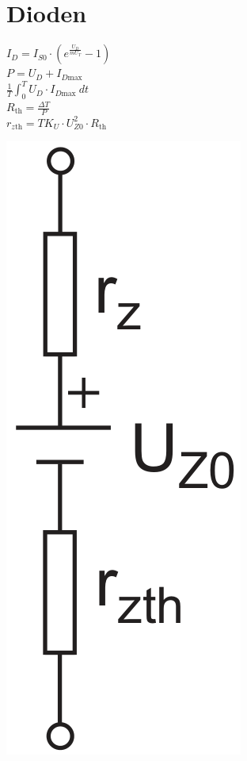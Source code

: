 \documentclass[a5paper, 12pt, twoside]{scrartcl}
\begin{document}
\section{Dioden}

\begin{minipage}{.69\linewidth}
  \dotfill\(I_D = I_{S0} \cdot \left( e^{\frac{U_D}{mU_T}}-1 \right)\)\\[1em]
  \dotfill\(P = U_D + I_{D\text{max}}\)\\[1em]
  \dotfill\(\frac{1}{T} \int_0^T U_D \cdot I_{D\text{max}}\ dt\)\\[1em]
  \dotfill\(R_{\text{th}} = \frac{\Delta T}{P}\)\\[1em]
  \dotfill\(r_{z\text{th}} = TK_U \cdot U^2_{Z0} \cdot R_{\text{th}}\)
\end{minipage}\hfill%
\begin{minipage}{.29\linewidth}
  {\centering
    \includegraphics[width=.4\textwidth]{ESB_ZDiode}
    \par
  }
\end{minipage}
\end{document}

